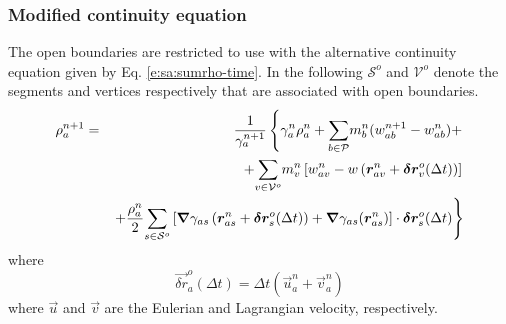 \subsubsection{Modified continuity equation}
The open boundaries are restricted to use with the alternative
continuity equation given by Eq. \eqref{e:sa:sumrho-time}. In the
following $\mathcal{S}^o$ and $\mathcal{V}^o$ denote the segments and
vertices respectively that are associated with open boundaries.
\begin{eqnarray}
\rho_a^{n+1} &=& \frac{1}{\gamma_a^{n+1}}\left\{ \gamma_a^n \rho_a^n +
\underset{b \in \mathcal{P}}{\sum} m_b^n (w_{ab}^{n+1} - w_{ab}^n) + \right.
\label{e:open:sumrho-time}
\\
&&\left. + \underset{v\in\mathcal{V}^o}{\sum}m_v^n\left[ w_{av}^n -
w\left( \bm{r}_{av}^n + \bm{\delta r}_v^o(\Delta t) \right) \right]\right.
\nonumber
\\
&&\left. + \frac{\rho_a^n}{2}\underset{s\in\mathcal{S}^o}{\sum}\left[
\bm{\nabla}\gamma_{as}\left(\bm{r}_{as}^n + \bm{\delta r}_s^o(\Delta t)\right) +
\bm{\nabla}\gamma_{as}(\bm{r}_{as}^n)
\right]\cdot\bm{\delta r}_s^o(\Delta t)\right\}
\nonumber
\end{eqnarray}
where
\begin{equation}
\vec{\delta r}_a^o(\Delta t) = \Delta t (\vec{u}_a^n + \vec{v}_a^n)
\label{e:open:deltar}
\end{equation}
where $\vec{u}$ and $\vec{v}$ are the Eulerian and Lagrangian
velocity, respectively.

